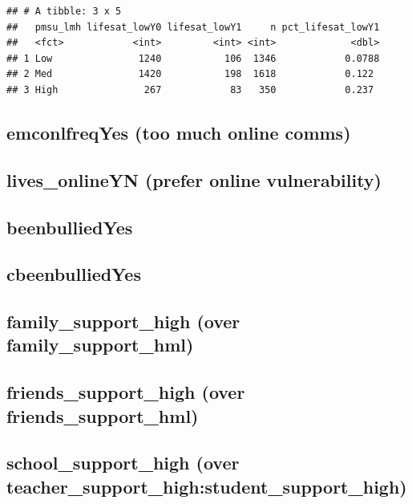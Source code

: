 \documentclass[
]{article}
\begin{document}
\begin{verbatim}
## # A tibble: 3 x 5
##   pmsu_lmh lifesat_lowY0 lifesat_lowY1     n pct_lifesat_lowY1
##   <fct>            <int>         <int> <int>             <dbl>
## 1 Low               1240           106  1346            0.0788
## 2 Med               1420           198  1618            0.122 
## 3 High               267            83   350            0.237
\end{verbatim}

\subsection{emconlfreqYes (too much online
comms)}\label{emconlfreqyes-too-much-online-comms}

\subsection{lives\_onlineYN (prefer online
vulnerability)}\label{lives_onlineyn-prefer-online-vulnerability}

\subsection{beenbulliedYes}\label{beenbulliedyes}

\subsection{cbeenbulliedYes}\label{cbeenbulliedyes}

\subsection{family\_support\_high (over
family\_support\_hml)}\label{family_support_high-over-family_support_hml}

\subsection{friends\_support\_high (over
friends\_support\_hml)}\label{friends_support_high-over-friends_support_hml}

\subsection{school\_support\_high (over
teacher\_support\_high:student\_support\_high)}\label{school_support_high-over-teacher_support_highstudent_support_high}
\end{document}
